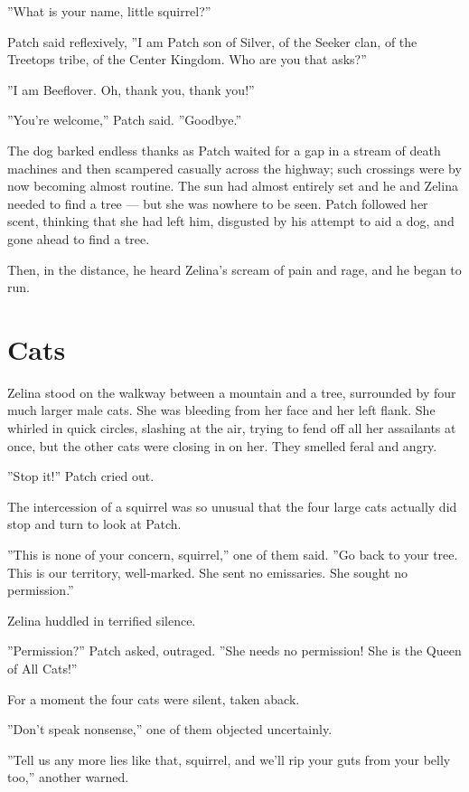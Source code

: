 \documentclass[12pt]{book}
\begin{document}
''What is your name, little squirrel?''

Patch said reflexively, ''I am Patch son of Silver, of the Seeker clan, of the Treetops tribe, of the Center Kingdom. Who are you that asks?''

''I am Beeflover. Oh, thank you, thank you!''

''You're welcome,'' Patch said. ''Goodbye.''

The dog barked endless thanks as Patch waited for a gap in a stream of death machines and then scampered casually across the highway; such crossings were by now becoming almost routine. The sun had almost entirely set and he and Zelina needed to find a tree ---
but she was nowhere to be seen. Patch followed her scent, thinking that she had left him, disgusted by his attempt to aid a dog, and gone ahead to find a tree.

Then, in the distance, he heard Zelina's scream of pain and rage, and he began to run.


\section{Cats}

Zelina stood on the walkway between a mountain and a tree, surrounded by four much larger male cats. She was bleeding from her face and her left flank. She whirled in quick circles, slashing at the air, trying to fend off all her assailants at once, but the other cats were closing in on her. They smelled feral and angry.

''Stop it!'' Patch cried out.

The intercession of a squirrel was so unusual that the four large cats actually did stop and turn to look at Patch.

''This is none of your concern, squirrel,'' one of them said. ''Go back to your tree. This is our territory, well-marked. She sent no emissaries. She sought no permission.''

Zelina huddled in terrified silence.

''Permission?'' Patch asked, outraged. ''She needs no permission! She is the Queen of All Cats!''

For a moment the four cats were silent, taken aback.

''Don't speak nonsense,'' one of them objected uncertainly.

''Tell us any more lies like that, squirrel, and we'll rip your guts from your belly too,'' another warned.
\end{document}
